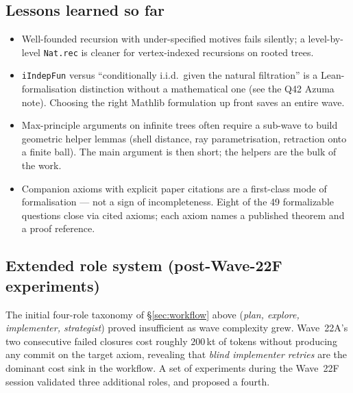 \documentclass[11pt,a4paper]{article}
\newcommand{\cmd}[1]{\texttt{\small #1}}
\theoremstyle{plain}
\theoremstyle{definition}
\begin{document}
\subsection{Lessons learned so far}

\begin{itemize}[leftmargin=1.3em]
  \item Well-founded recursion with under-specified motives fails
        silently; a level-by-level \cmd{Nat.rec} is cleaner for
        vertex-indexed recursions on rooted trees.
  \item \cmd{iIndepFun} versus ``conditionally i.i.d.\ given the
        natural filtration'' is a Lean-formalisation distinction
        without a mathematical one (see the Q42 Azuma note). Choosing
        the right Mathlib formulation up front saves an entire wave.
  \item Max-principle arguments on infinite trees often require a
        sub-wave to build geometric helper lemmas (shell distance,
        ray parametrisation, retraction onto a finite ball). The main
        argument is then short; the helpers are the bulk of the work.
  \item Companion axioms with explicit paper citations are a
        first-class mode of formalisation --- not a sign of
        incompleteness. Eight of the 49 formalizable questions close
        via cited axioms; each axiom names a published theorem and a
        proof reference.
\end{itemize}

\subsection{Extended role system (post-Wave-22F experiments)}

The initial four-role taxonomy of \S\ref{sec:workflow} above
(\emph{plan, explore, implementer, strategist}) proved insufficient as
wave complexity grew. Wave~22A's two consecutive failed closures cost
roughly $200$\,kt of tokens without producing any commit on the target
axiom, revealing that \emph{blind implementer retries} are the dominant
cost sink in the workflow. A set of experiments during the Wave~22F
session validated three additional roles, and proposed a fourth.
\end{document}
